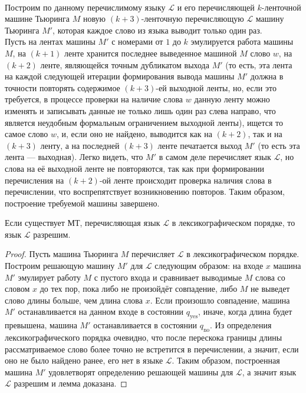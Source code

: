 \documentclass[11pt]{article}
\begin{document}
\\
Построим по данному перечислимому языку $\mathcal{L}$ и его перечисляющей $k$-ленточной машине Тьюринга $M$ новую $(k + 3)$-ленточную перечисляющую $\mathcal{L}$ машину Тьюринга $M'$, которая каждое слово из языка выводит только один раз. \\
Пусть на лентах машины $M'$ с номерами от $1$ до $k$ эмулируется работа машины $M$, на $(k + 1)$ ленте хранится последнее выведенное машиной $M$ слово $w$, на $(k + 2)$ ленте, являющейся точным дубликатом выхода $M'$ (то есть, эта лента на каждой следующей итерации формирования вывода машины $M'$ должна в точности повторять содержимое $(k + 3)$-ей выходной ленты, но, если это требуется, в процессе проверки на наличие слова $w$ данную ленту можно изменять и записывать данные не только лишь один раз слева направо, что является неудобным формальным ограничением выходной ленты), ищется то самое слово $w$, и, если оно не найдено, выводится как на $(k + 2)$, так и на $(k + 3)$ ленту, а на последней $(k + 3)$ ленте печатается выход $M'$ (то есть эта лента --- выходная). Легко видеть, что $M'$ в самом деле перечисляет язык $\mathcal{L}$, но слова на её выходной ленте не повторяются, так как при формировании перечисления на $(k + 2)$-ой ленте происходит проверка наличия слова в перечислении, что воспрепятствует возникновению повторов. Таким образом, построение требуемой машины завершено.

\begin{lemma}
    Если существует МТ, перечисляющая язык $\mathcal{L}$ в лексикографическом порядке, то язык $\mathcal{L}$ разрешим.
\end{lemma}

\begin{proof}
    Пусть машина Тьюринга $M$ перечисляет $\mathcal{L}$ в лексикографическом порядке. Построим решающую машину $M'$ для $\mathcal{L}$ следующим образом: на входе $x$ машина $M'$ эмулирует работу $M$ с пустого входа и сравнивает выводимые $M$ слова со словом $x$ до тех пор, пока либо не произойдёт совпадение, либо $M$ не выведет слово длины больше, чем длина слова $x$. Если произошло совпадение, машина $M'$ останавливается на данном входе в состоянии $q_{\text{yes}}$, иначе, когда длина будет превышена, машина $M'$ останавливается в состоянии $q_{\text{no}}$. Из определения лексикографического порядка очевидно, что после перескока границы длины рассматриваемое слово более точно не встретится в перечислении, а значит, если оно не было найдено ранее, его нет в языке $\mathcal{L}$. Таким образом, построенная машина $M'$ удовлетворят определению решающей машины для $\mathcal{L}$, а значит язык $\mathcal{L}$ разрешим и лемма доказана.
\end{proof}
\end{document}
